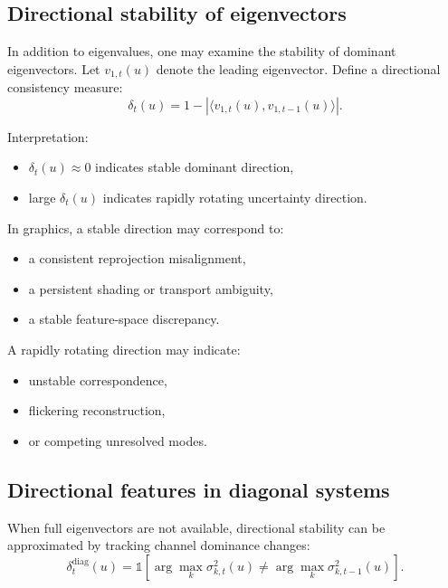 \documentclass[11pt,letterpaper]{article}
\theoremstyle{gcresult}
\theoremstyle{definition}
\begin{document}

\subsection{Directional stability of eigenvectors}

In addition to eigenvalues, one may examine the stability of dominant eigenvectors. Let $v_{1,t}(u)$ denote the leading eigenvector. Define a directional consistency measure:
\begin{equation}
\delta_t(u)=1-\left|\langle v_{1,t}(u), v_{1,t-1}(u)\rangle\right|.
\end{equation}

Interpretation:
\begin{itemize}[leftmargin=1.5em]
    \item $\delta_t(u)\approx 0$ indicates stable dominant direction,
    \item large $\delta_t(u)$ indicates rapidly rotating uncertainty direction.
\end{itemize}

In graphics, a stable direction may correspond to:
\begin{itemize}[leftmargin=1.5em]
    \item a consistent reprojection misalignment,
    \item a persistent shading or transport ambiguity,
    \item a stable feature-space discrepancy.
\end{itemize}

A rapidly rotating direction may indicate:
\begin{itemize}[leftmargin=1.5em]
    \item unstable correspondence,
    \item flickering reconstruction,
    \item or competing unresolved modes.
\end{itemize}


\subsection{Directional features in diagonal systems}

When full eigenvectors are not available, directional stability can be approximated by tracking channel dominance changes:
\begin{equation}
\delta_t^{\mathrm{diag}}(u)=
\mathbb{1}\!\left[\arg\max_k \sigma^2_{k,t}(u)\neq \arg\max_k \sigma^2_{k,t-1}(u)\right].
\end{equation}
\end{document}
